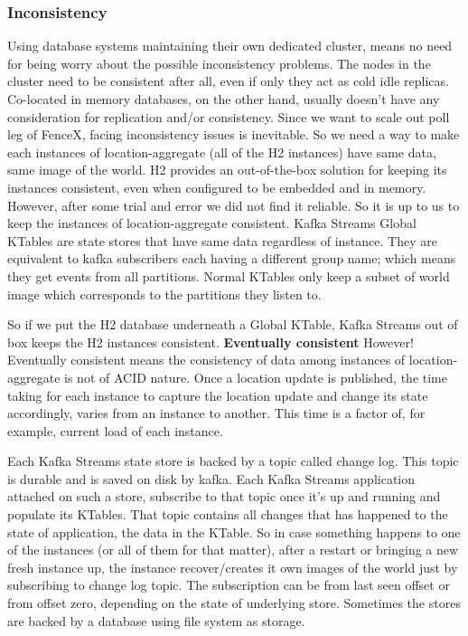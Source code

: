 \documentclass[a4]{report}
\begin{document}
    \subsubsection{Inconsistency}
    Using database systems maintaining their own dedicated cluster, means no need for being worry about the
    possible inconsistency problems.
    The nodes in the cluster need to be consistent after all, even if only they act as cold idle replicas.
    Co-located in memory databases, on the other hand, usually doesn't have any consideration for replication and/or
    consistency.
    Since we want to scale out poll leg of FenceX, facing inconsistency issues is inevitable.
    So we need a way to make each instances of location-aggregate (all of the H2 instances) have same data, same
    image of the world.
    H2 provides an out-of-the-box solution for keeping its instances consistent, even when configured to be embedded
    and in memory.
    However, after some trial and error we did not find it reliable.
    So it is up to us to keep the instances of location-aggregate consistent.
    Kafka Streams Global KTables are state stores that have same data regardless of instance.
    They are equivalent to kafka subscribers each having a different group name;
    which means they get events from all partitions.
    Normal KTables only keep a subset of world image which corresponds to the partitions they listen to.

    So if we put the H2 database underneath a Global KTable, Kafka Streams out of box keeps the H2 instances
    consistent.
    \textbf{Eventually consistent} However!
    Eventually consistent means the consistency of data among instances of location-aggregate is not of ACID nature.
    Once a location update is published, the time taking for each instance to capture the location update and change
    its state accordingly, varies from an instance to another.
    This time is a factor of, for example, current load of each instance.

    Each Kafka Streams state store is backed by a topic called change log.
    This topic is durable and is saved on disk by kafka.
    Each Kafka Streams application attached on such a store, subscribe to that topic once it's up and running and
    populate its KTables.
    That topic contains all changes that has happened to the state of application, the data in the KTable.
    So in case something happens to one of the instances (or all of them for that matter), after a restart or bringing
    a new fresh instance up, the instance recover/creates it own images of the world just by subscribing to change
    log topic.
    The subscription can be from last seen offset or from offset zero, depending on the state of underlying store.
    Sometimes the stores are backed by a database using file system as storage.
\end{document}
